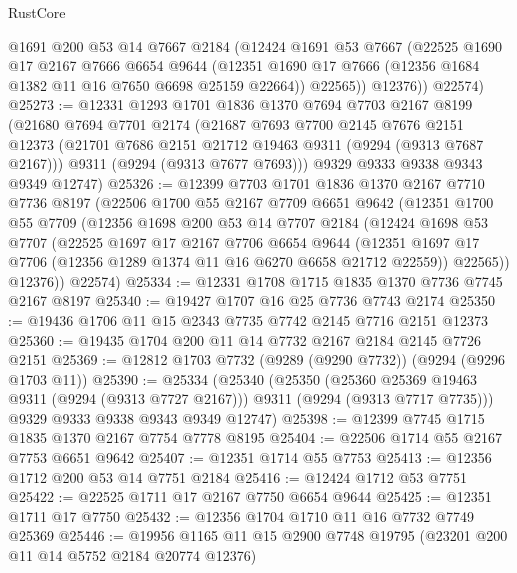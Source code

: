 \begin{lexlean}{RustCore}
\begin{coremodule}
          @1691
          @200
          @53
          @14
          @7667
          @2184
          (@12424
            @1691
            @53
            @7667
            (@22525
              @1690
              @17
              @2167
              @7666
              @6654
              @9644
              (@12351 @1690 @17 @7666 (@12356 @1684 @1382 @11 @16 @7650 @6698 @25159 @22664))
              @22565))
          @12376))
      @22574)
@25273 := @12331
    @1293
    @1701
    @1836
    @1370
    @7694
    @7703
    @2167
    @8199
    (@21680
      @7694
      @7701
      @2174
      (@21687
        @7693
        @7700
        @2145
        @7676
        @2151
        @12373
        (@21701 @7686 @2151 @21712 @19463 @9311 (@9294 (@9313 @7687 @2167)))
        @9311
        (@9294 (@9313 @7677 @7693)))
      @9329
      @9333
      @9338
      @9343
      @9349
      @12747)
@25326 := @12399
    @7703
    @1701
    @1836
    @1370
    @2167
    @7710
    @7736
    @8197
    (@22506
      @1700
      @55
      @2167
      @7709
      @6651
      @9642
      (@12351
        @1700
        @55
        @7709
        (@12356
          @1698
          @200
          @53
          @14
          @7707
          @2184
          (@12424
            @1698
            @53
            @7707
            (@22525
              @1697
              @17
              @2167
              @7706
              @6654
              @9644
              (@12351 @1697 @17 @7706 (@12356 @1289 @1374 @11 @16 @6270 @6658 @21712 @22559))
              @22565))
          @12376))
      @22574)
@25334 := @12331 @1708 @1715 @1835 @1370 @7736 @7745 @2167 @8197
@25340 := @19427 @1707 @16 @25 @7736 @7743 @2174
@25350 := @19436 @1706 @11 @15 @2343 @7735 @7742 @2145 @7716 @2151 @12373
@25360 := @19435 @1704 @200 @11 @14 @7732 @2167 @2184 @2145 @7726 @2151
@25369 := @12812 @1703 @7732 (@9289 (@9290 @7732)) (@9294 (@9296 @1703 @11))
@25390 := @25334
    (@25340
      (@25350
        (@25360 @25369 @19463 @9311 (@9294 (@9313 @7727 @2167)))
        @9311
        (@9294 (@9313 @7717 @7735)))
      @9329
      @9333
      @9338
      @9343
      @9349
      @12747)
@25398 := @12399 @7745 @1715 @1835 @1370 @2167 @7754 @7778 @8195
@25404 := @22506 @1714 @55 @2167 @7753 @6651 @9642
@25407 := @12351 @1714 @55 @7753
@25413 := @12356 @1712 @200 @53 @14 @7751 @2184
@25416 := @12424 @1712 @53 @7751
@25422 := @22525 @1711 @17 @2167 @7750 @6654 @9644
@25425 := @12351 @1711 @17 @7750
@25432 := @12356 @1704 @1710 @11 @16 @7732 @7749 @25369
@25446 := @19956 @1165 @11 @15 @2900 @7748 @19795 (@23201 @200 @11 @14 @5752 @2184 @20774 @12376)

\end{coremodule}
\end{lexlean}
